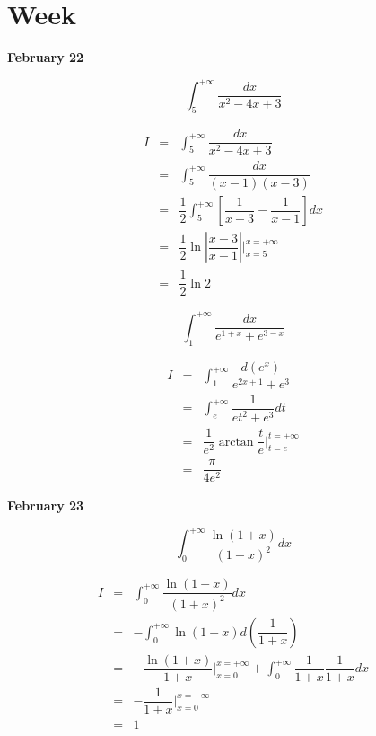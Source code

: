 \section{Week }
\textcolor{purplea}{\textbf{February 22}}

\begin{example}[][Exam: 28.4.1]
	$$\int_{5}^{+\infty}\dfrac{dx}{x^{2}-4x+3}$$
\end{example}
\begin{solution}
	\begin{eqnarray*}
		I & = & \int_{5}^{+\infty}\dfrac{dx}{x^{2}-4x+3}\\
		  & = & \int_{5}^{+\infty}\dfrac{dx}{(x-1)(x-3)}\\
		  & = & \dfrac{1}{2}\int_{5}^{+\infty}\left[\dfrac{1}{x-3}-\dfrac{1}{x-1}\right]dx\\
		  & = & \dfrac{1}{2}\ln\left|\dfrac{x-3}{x-1}\right|\big|_{x=5}^{x=+\infty}\\
		  & = & \dfrac{1}{2}\ln 2
	\end{eqnarray*}
\end{solution}

\begin{example}[][Exam: 28.4.2]
	$$\int_{1}^{+\infty}\dfrac{dx}{e^{1+x}+e^{3-x}}$$
\end{example}
\begin{solution}
	\begin{eqnarray*}
		I & = & \int_{1}^{+\infty}\dfrac{d(e^{x})}{e^{2x+1}+e^{3}}\\
		  & = & \int_{e}^{+\infty}\dfrac{1}{et^{2}+e^{3}}dt\\
		  & = & \dfrac{1}{e^{2}}\arctan \dfrac{t}{e}\big|_{t=e}^{t=+\infty}\\
		  & = & \dfrac{\pi}{4e^{2}}
	\end{eqnarray*}
\end{solution}

\textcolor{purplea}{\textbf{February 23}}

\begin{example}[][Exam: 28.4.3]
	$$\int_{0}^{+\infty}\dfrac{\ln(1+x)}{(1+x)^{2}}dx$$
\end{example}
\begin{solution}
	\begin{eqnarray*}
		I & = & \int_{0}^{+\infty}\dfrac{\ln(1+x)}{(1+x)^{2}}dx\\
		  & = & -\int_{0}^{+\infty}\ln(1+x)d\left(\dfrac{1}{1+x}\right)\\
		  & = & -\dfrac{\ln(1+x)}{1+x}\big|_{x=0}^{x=+\infty} + \int_{0}^{+\infty}\dfrac{1}{1+x}\dfrac{1}{1+x}dx\\
		  & = & -\dfrac{1}{1+x}\big|_{x=0}^{x=+\infty}\\
		  & = & 1
	\end{eqnarray*}
\end{solution}

